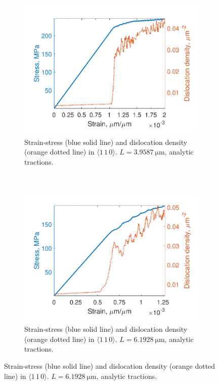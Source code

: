 \begin{figure}
    \begin{subfigure}[t]{0.45\linewidth}
        \includegraphics[width=\linewidth]{../data/density_11-Mar-2021_4_tensile_ni_110.pdf}
        \caption{Strain-stress (blue solid line) and dislocation density (orange dotted line) in $\langle 1\, 1\, 0 \rangle$. $L = \SI{3.9587}{\micro\metre}$, analytic tractions.}
        \label{sf:sressDens4}
    \end{subfigure}
    ~
    \begin{subfigure}[t]{0.45\linewidth}
        \includegraphics[width=\linewidth]{../data/density_16-Mar-2021_4_tensile_ni_110.pdf}
        \caption{Strain-stress (blue solid line) and dislocation density (orange dotted line) in $\langle 1\, 1\, 0 \rangle$. $L = \SI{6.1928}{\micro\metre}$, analytic tractions.}
        \label{sf:sressDens5}
    \end{subfigure}
\end{figure}

